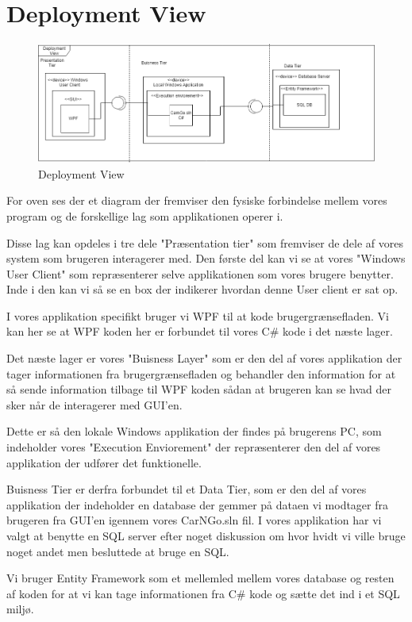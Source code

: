 \documentclass[Arkitektur/System_main.tex]{subfiles}
\begin{document}
\section{Deployment View}
\begin{figure}
    \centering
    \includegraphics[width=\linewidth]{Arkitektur/4+1View/Graphics/DeploymentDiagram.png}
    \caption{Deployment View}
\end{figure}

For oven ses der et diagram der fremviser den fysiske forbindelse mellem vores program og de forskellige lag som applikationen operer i. 

Disse lag kan opdeles i tre dele "Præsentation tier" som fremviser de dele af vores system som brugeren interagerer med. Den første del kan vi se at vores "Windows User Client" som repræsenterer selve applikationen som vores brugere benytter. Inde i den kan vi så se en box der indikerer hvordan denne User client er sat op. 

I vores applikation specifikt bruger vi WPF til at kode brugergrænsefladen. Vi kan her se at WPF koden her er forbundet til vores C\# kode i det næste lager. 

Det næste lager er vores "Buisness Layer" som er den del af vores applikation der tager informationen fra brugergrænsefladen og behandler den information for at så sende information tilbage til WPF koden sådan at brugeren kan se hvad der sker når de interagerer med GUI'en. 

Dette er så den lokale Windows applikation der findes på brugerens PC, som indeholder vores "Execution Enviorement" der repræsenterer den del af vores applikation der udfører det funktionelle. 

Buisness Tier er derfra forbundet til et Data Tier, som er den del af vores applikation der indeholder en database der gemmer på dataen vi modtager fra brugeren fra GUI'en igennem vores CarNGo.sln fil. I vores applikation har vi valgt at benytte en SQL server efter noget diskussion om hvor hvidt vi ville bruge noget andet men besluttede at bruge en SQL. 

Vi bruger Entity Framework som et mellemled mellem vores database og resten af koden for at vi kan tage informationen fra C\# kode og sætte det ind i et SQL miljø. 
\end{document}

